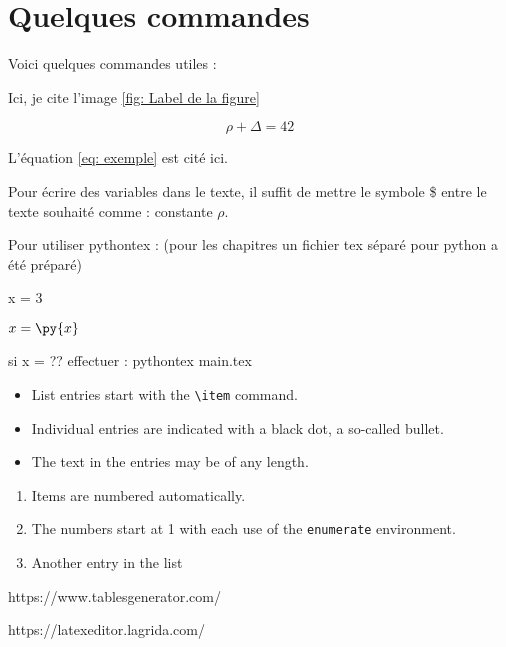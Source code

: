 
\section{Quelques commandes}

Voici quelques commandes utiles :


Ici, je cite l'image \ref{fig: Label de la figure}



\begin{equation} \label{eq: exemple}
\rho + \Delta = 42
\end{equation}

L'équation \ref{eq: exemple} est cité ici. 


Pour écrire des variables dans le texte, il suffit de mettre le symbole \$ entre le texte souhaité comme : constante $\rho$.

Pour utiliser pythontex : (pour les chapitres un fichier tex séparé pour python a été préparé)
\begin{pycode}
x = 3
\end{pycode}
       
$x = \py{x}$

si x = ?? effectuer :
pythontex main.tex



\begin{itemize}
    \item List entries start with the \verb|\item| command.
    \item Individual entries are indicated with a black dot, a so-called bullet.
    \item The text in the entries may be of any length.
  \end{itemize}


  \begin{enumerate}
    \item Items are numbered automatically.
    \item The numbers start at 1 with each use of the \texttt{enumerate} environment.
    \item Another entry in the list
  \end{enumerate}


  https://www.tablesgenerator.com/


   https://latexeditor.lagrida.com/